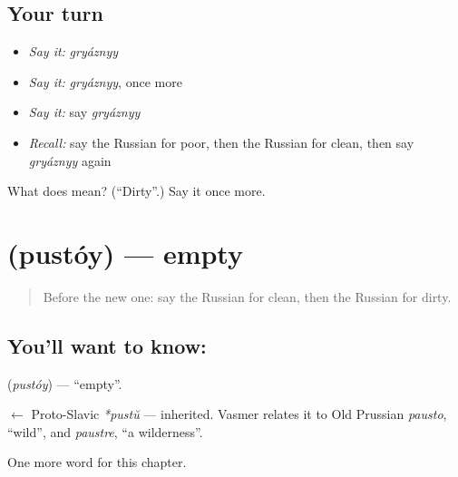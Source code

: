 \subsection*{Your turn}
\begin{itemize}
\raggedright
  \item \emph{Say it:} \emph{gryáznyy}
  \item \emph{Say it:} \emph{gryáznyy}, once more
  \item \emph{Say it:} say \emph{gryáznyy}
  \item \emph{Recall:} say the Russian for poor, then the Russian for clean, then say \emph{gryáznyy} again
\end{itemize}

\begin{tcolorbox}[breakable,colback=teal!4,colframe=teal!35!black,title={Before you move on}]
What does  mean? (\textquotedblleft{}Dirty\textquotedblright{}.) Say it once more.
\end{tcolorbox}
\section[\texorpdfstring{\ru{пустой} (pustóy)}{пустой (pustóy)}]{ (pustóy) — empty}

\label{lesson:RU-C156-pustoy}



\begin{quote}
Before the new one: say the Russian for clean, then the Russian for dirty.
\end{quote}

\subsection*{You'll want to know: }
\textbf{} (\emph{pustóy}) — \textquotedblleft{}empty\textquotedblright{}.

\begin{cousinweb}
\textbf{} $\leftarrow$ Proto-Slavic \emph{*pustŭ} — inherited. Vasmer relates it to Old Prussian \emph{pausto}, \textquotedblleft{}wild\textquotedblright{}, and \emph{paustre}, \textquotedblleft{}a wilderness\textquotedblright{}.
\end{cousinweb}

\begin{grammarlens}[title={What you've built}]
One more word for this chapter.
\end{grammarlens}

